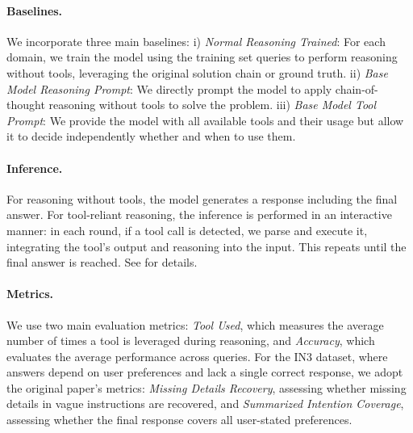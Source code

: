 \paragraph{Baselines.} We incorporate three main baselines:
i) \textit{Normal Reasoning Trained}: For each domain, we train the model using the training set queries to perform reasoning without tools, leveraging the original solution chain or ground truth.
ii) \textit{Base Model Reasoning Prompt}: We directly prompt the model to apply chain-of-thought reasoning without tools to solve the problem.
iii) \textit{Base Model Tool Prompt}: We provide the model with all available tools and their usage but allow it to decide independently whether and when to use them.

\paragraph{Inference.} For reasoning without tools, the model generates a response including the final answer. For tool-reliant reasoning, the inference is performed in an interactive manner: in each round, if a tool call is detected, we parse and execute it, integrating the tool's output and reasoning into the input. This repeats until the final answer is reached. See  for details.

\paragraph{Metrics.} We use two main evaluation metrics: \textit{Tool Used}, which measures the average number of times a tool is leveraged during reasoning, and \textit{Accuracy}, which evaluates the average performance across queries. For the IN3 dataset, where answers depend on user preferences and lack a single correct response, we adopt the original paper’s metrics: \textit{Missing Details Recovery}, assessing whether missing details in vague instructions are recovered, and \textit{Summarized Intention Coverage}, assessing whether the final response covers all user-stated preferences.


